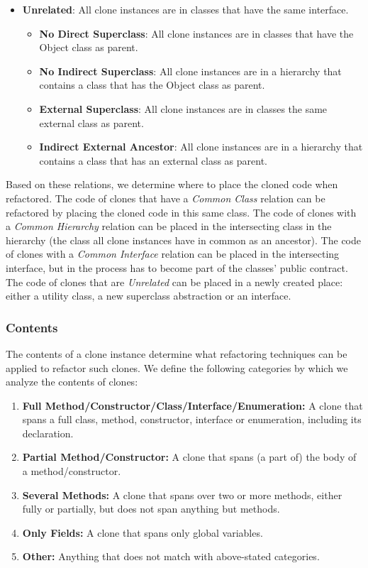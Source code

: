 \documentclass[sigconf,review]{acmart}
\begin{document}
\begin{itemize}
\begin{itemize}
    \end{itemize}
    \item \textbf{Unrelated}: All clone instances are in classes that have the same interface.
    \begin{itemize}
        \item \textbf{No Direct Superclass}: All clone instances are in classes that have the Object class as parent.
        \item \textbf{No Indirect Superclass}: All clone instances are in a hierarchy that contains a class that has the Object class as parent.
        \item \textbf{External Superclass}: All clone instances are in classes the same external class as parent.
        \item \textbf{Indirect External Ancestor}: All clone instances are in a hierarchy that contains a class that has an external class as parent.
    \end{itemize}
\end{itemize}

Based on these relations, we determine where to place the cloned code when refactored. The code of clones that have a \textit{Common Class} relation can be refactored by placing the cloned code in this same class. The code of clones with a \textit{Common Hierarchy} relation can be placed in the intersecting class in the hierarchy (the class all clone instances have in common as an ancestor). The code of clones with a \textit{Common Interface} relation can be placed in the intersecting interface, but in the process has to become part of the classes' public contract. The code of clones that are \textit{Unrelated} can be placed in a newly created place: either a utility class, a new superclass abstraction or an interface.

\subsubsection{Contents}\label{sec:contents}
The contents of a clone instance determine what refactoring techniques can be applied to refactor such clones. We define the following categories by which we analyze the contents of clones:
\begin{enumerate}
  \item \textbf{Full Method/Constructor/Class/Interface/Enumeration:} A clone that spans a full class, method, constructor, interface or enumeration, including its declaration.
  \item \textbf{Partial Method/Constructor:} A clone that spans (a part of) the body of a method/constructor.
  \item \textbf{Several Methods:} A clone that spans over two or more methods, either fully or partially, but does not span anything but methods.
  \item \textbf{Only Fields:} A clone that spans only global variables.
  \item \textbf{Other:} Anything that does not match with above-stated categories.
\end{enumerate}
\end{document}
